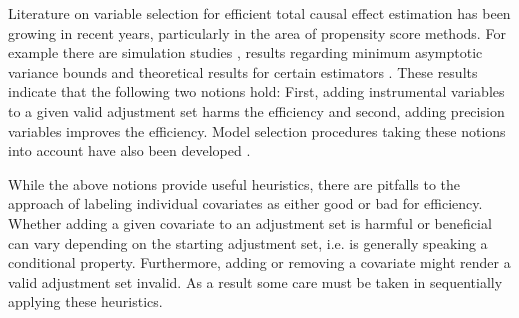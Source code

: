 \documentclass[11pt,a4paper]{article}
\theoremstyle{definition}
\theoremstyle{remark}
\begin{document}


Literature on variable selection for efficient total causal effect estimation has been growing in recent years, particularly in the area of propensity score methods. 
For example there are simulation studies \citep{brookhart2006variable,lefebvre2008impact}, results regarding minimum asymptotic variance bounds \citep{rotnitzky1995semiparametric,hahn2004functional,rotnitzky2010note} and theoretical results for certain estimators \citep{robinson1991some,lunceford2004stratification,schnitzer2016variable,wooldridge2016should}. These results indicate that the following two notions hold: First, adding instrumental variables to a given valid adjustment set harms the efficiency and second, adding precision variables improves the efficiency. Model selection procedures taking these notions into account have also been developed \citep{vanderweele2011new,shortreed2017outcome}. 


While the above notions provide useful heuristics, there are pitfalls to the approach of labeling individual covariates as either good or bad for efficiency. Whether adding a given covariate to an adjustment set is harmful or beneficial can vary depending on the starting adjustment set, i.e. is generally speaking a conditional property. Furthermore, adding or removing a covariate might render a valid adjustment set invalid. As a result some care must be taken in sequentially applying these heuristics. 
\end{document}
